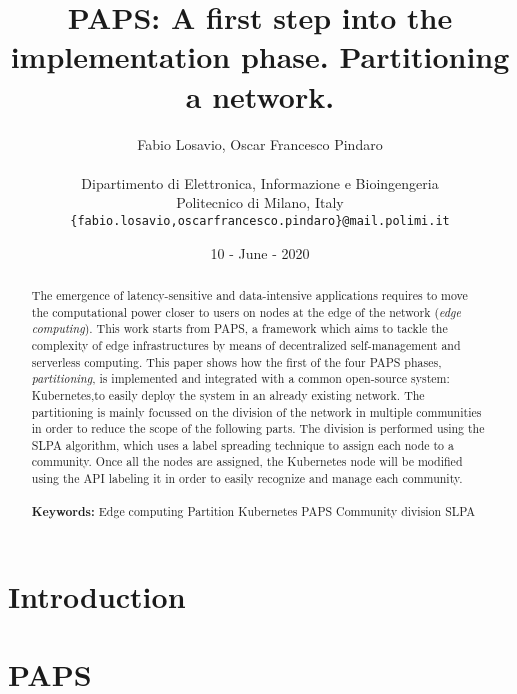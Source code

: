 \documentclass{article} %
\title{\textbf{\huge{PAPS: A first step into the implementation phase. Partitioning a network.}}}
\author{\color{black}Fabio Losavio, Oscar Francesco Pindaro \\ \\
        Dipartimento di Elettronica, Informazione e Bioingengeria \\
        Politecnico di Milano, Italy \\
        \texttt{\{fabio.losavio,oscarfrancesco.pindaro\}@mail.polimi.it}}
\date{10 - June - 2020}
\begin{document}
\maketitle

\begin{abstract}
    The emergence of latency-sensitive and data-intensive applications requires to move the 
    computational power closer to users on nodes at the edge of the network (\textit{edge computing}).
    This work starts from PAPS, a framework which aims to tackle the complexity of edge 
    infrastructures by means of decentralized self-management and serverless computing. This paper
    shows how the first of the four PAPS phases, \textit{partitioning}, is implemented and integrated
    with a common open-source system: Kubernetes,to easily deploy the system in an already
    existing network. The partitioning is mainly focussed on the division of the network in multiple 
    communities in order to reduce the scope of the following parts. The division is performed using 
    the SLPA algorithm, which uses a label spreading technique to assign each node to a
    community. Once all the nodes are assigned, the Kubernetes node will be modified using the API 
    labeling it in order to easily recognize and manage each community.
    \\ \\
    \textbf{Keywords:} Edge computing \textbf{\textperiodcentered} Partition 
    \textbf{\textperiodcentered} Kubernetes \textbf{\textperiodcentered} PAPS
    \textbf{\textperiodcentered} Community division \textbf{\textperiodcentered} SLPA
    
\end{abstract}
{{\section{Introduction}\label{sect:intro}}}




\clearpage
{{\section{PAPS}\label{sect:paps}}}

\end{document}
